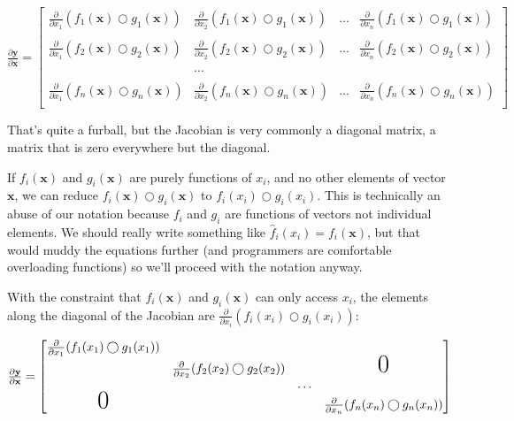 \documentclass[11pt]{article}
\begin{document}
$
\frac{\partial \mathbf{y}}{\partial \mathbf{x}}  = \begin{bmatrix}
\frac{\partial}{\partial x_1} ( f_{1}(\mathbf{x}) \bigcirc g_{1}(\mathbf{x}) ) & \frac{\partial}{\partial x_2} ( f_{1}(\mathbf{x}) \bigcirc g_{1}(\mathbf{x}) ) & \ldots & \frac{\partial}{\partial x_n} ( f_{1}(\mathbf{x}) \bigcirc g_{1}(\mathbf{x}) )\\\\
\frac{\partial}{\partial x_1} ( f_{2}(\mathbf{x}) \bigcirc g_{2}(\mathbf{x}) ) & \frac{\partial}{\partial x_2} ( f_{2}(\mathbf{x}) \bigcirc g_{2}(\mathbf{x}) ) & \ldots & \frac{\partial}{\partial x_n} ( f_{2}(\mathbf{x}) \bigcirc g_{2}(\mathbf{x}) )\\\\
& \ldots\\\\
\frac{\partial}{\partial x_1} ( f_{n}(\mathbf{x}) \bigcirc g_{n}(\mathbf{x}) ) & \frac{\partial}{\partial x_2} ( f_{n}(\mathbf{x}) \bigcirc g_{n}(\mathbf{x}) ) & \ldots & \frac{\partial}{\partial x_n} ( f_{n}(\mathbf{x}) \bigcirc g_{n}(\mathbf{x}) )\\
\end{bmatrix}
$

That's quite a furball, but the Jacobian is very commonly a diagonal matrix, a matrix that is zero everywhere but the diagonal. 

If $f_i(\mathbf{x})$ and $g_i(\mathbf{x})$ are purely functions of $x_i$, and no other elements of vector $\mathbf{x}$, we can reduce $f_i(\mathbf{x}) \bigcirc g_i(\mathbf{x})$ to $f_i(x_i) \bigcirc g_i(x_i)$. This is technically an abuse of our notation because $f_i$ and $g_i$ are functions of vectors not individual elements. We should really write something like $\hat f_{i}(x_i) = f_{i}(\mathbf{x})$, but that would muddy the equations further (and programmers are comfortable overloading functions) so we'll proceed with the notation anyway.

With the constraint that $f_i(\mathbf{x})$ and $g_i(\mathbf{x})$ can only access $x_i$, the elements along the diagonal of the Jacobian are $\frac{\partial}{\partial x_i} ( f_i(x_i) \bigcirc g_i(x_i) )$:

$
\frac{\partial \mathbf{y}}{\partial \mathbf{x}}  = \begin{bmatrix}
\frac{\partial}{\partial x_1} ( f_{1}(x_1) \bigcirc g_{1}(x_1) )\\
& \frac{\partial}{\partial x_2} (f_{2}(x_2) \bigcirc g_{2}(x_2) ) & &\text{\huge0}\\
& & \ldots \\
\text{\huge0}& & & \frac{\partial}{\partial x_n} (f_{n}(x_n) \bigcirc g_{n}(x_n) )
\end{bmatrix}
$
\end{document}
